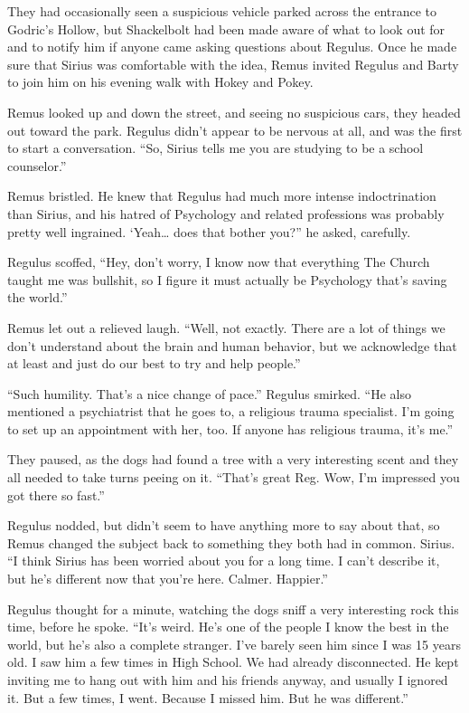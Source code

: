 \documentclass[12pt,twoside,openright]{memoir}
\begin{document}
They had occasionally seen a suspicious vehicle parked across the entrance to Godric's Hollow, but Shackelbolt had been made aware of what to look out for and to notify him if anyone came asking questions about Regulus. Once he made sure that Sirius was comfortable with the idea, Remus invited Regulus and Barty to join him on his evening walk with Hokey and Pokey.

Remus looked up and down the street, and seeing no suspicious cars, they headed out toward the park. Regulus didn't appear to be nervous at all, and was the first to start a conversation. ``So, Sirius tells me you are studying to be a school counselor.''

Remus bristled. He knew that Regulus had much more intense indoctrination than Sirius, and his hatred of Psychology and related professions was probably pretty well ingrained. ‘Yeah… does that bother you?'' he asked, carefully. 

Regulus scoffed, ``Hey, don't worry, I know now that everything The Church taught me was bullshit, so I figure it must actually be Psychology that's saving the world.''

Remus let out a relieved laugh. ``Well, not exactly. There are a lot of things we don't understand about the brain and human behavior, but we acknowledge that at least and just do our best to try and help people.''

``Such humility. That's a nice change of pace.'' Regulus smirked. ``He also mentioned a psychiatrist that he goes to, a religious trauma specialist. I'm going to set up an appointment with her, too. If anyone has religious trauma, it's me.'' 

They paused, as the dogs had found a tree with a very interesting scent and they all needed to take turns peeing on it.
``That's great Reg. Wow, I'm impressed you got there so fast.''

Regulus nodded, but didn't seem to have anything more to say about that, so Remus changed the subject back to something they both had in common. Sirius. ``I think Sirius has been worried about you for a long time. I can't describe it, but he's different now that you're here. Calmer. Happier.''

Regulus thought for a minute, watching the dogs sniff a very interesting rock this time, before he spoke. ``It's weird. He's one of the people I know the best in the world, but he's also a complete stranger. I've barely seen him since I was 15 years old. I saw him a few times in High School. We had already disconnected. He kept inviting me to hang out with him and his friends anyway, and usually I ignored it. But a few times, I went. Because I missed him. But he was different.''
\end{document}

